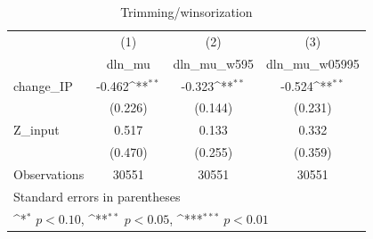 \begin{table}[htbp]\centering
\def\sym#1{\ifmmode^{#1}\else\(^{#1}\)\fi}
\caption{Trimming/winsorization}
\begin{tabular}{l*{3}{c}}
\hline\hline
            &\multicolumn{1}{c}{(1)}&\multicolumn{1}{c}{(2)}&\multicolumn{1}{c}{(3)}\\
            &\multicolumn{1}{c}{dln\_mu}&\multicolumn{1}{c}{dln\_mu\_w595}&\multicolumn{1}{c}{dln\_mu\_w05995}\\
\hline
change\_IP   &      -0.462\sym{**} &      -0.323\sym{**} &      -0.524\sym{**} \\
            &     (0.226)         &     (0.144)         &     (0.231)         \\
[1em]
Z\_input     &       0.517         &       0.133         &       0.332         \\
            &     (0.470)         &     (0.255)         &     (0.359)         \\
\hline
Observations&       30551         &       30551         &       30551         \\
\hline\hline
\multicolumn{4}{l}{\footnotesize Standard errors in parentheses}\\
\multicolumn{4}{l}{\footnotesize \sym{*} \(p<0.10\), \sym{**} \(p<0.05\), \sym{***} \(p<0.01\)}\\
\end{tabular}
\end{table}
